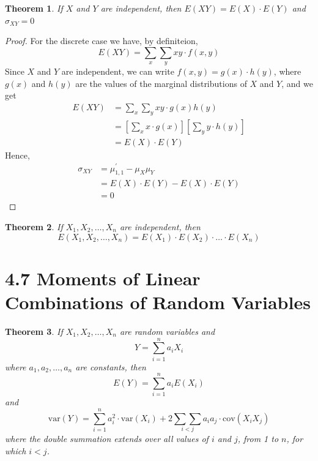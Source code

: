 \documentclass[
10pt,reqno
]{amsart}
\newtheorem{theorem}{Theorem}[section]
\theoremstyle{definition}
\begin{document}
\begin{theorem}
If \(X\) and \(Y\) are independent, then \(E(XY)= E(X) \cdot E(Y)\) and \(\sigma_{XY} =0 \)
\end{theorem}
\begin{proof}
For the discrete case we have, by definiteion, 
\[
E(XY)=\sum_x \sum_y xy \cdot f(x,y)
\]
Since \(X\) and \(Y\) are independent, we can write \(f(x,y)=g(x)\cdot h(y)\), where \(g(x)\) and \(h(y)\) are the values of the marginal distributions of \(X\) and \(Y\), and we get
\begin{align*}
E(XY)&=\sum_x \sum_y xy \cdot g(x) h(y)\\
&=\left [ \sum_x x \cdot g(x) \right ]\left [ \sum_y y \cdot h(y) \right ]\\
&= E(X) \cdot E(Y)
\end{align*}
Hence,
\begin{align*}
\sigma_{XY} &= \mu_{1,1}^{'}-\mu_{X} \mu_{Y}\\
&=E(X) \cdot E(Y) - E(X) \cdot E(Y)\\
&=0
\end{align*}
\end{proof}

\begin{theorem}
If \(X_1, X_2,\ldots,X_n\) are independent, then 
\[
E(X_1, X_2,\ldots,X_n)=E(X_1)\cdot E(X_2) \cdot \ldots \cdot E(X_n)
\]
\end{theorem}

\newpage

\section*{4.7 Moments of Linear Combinations of Random Variables}

\begin{theorem}
If \(X_1, X_2,\ldots,X_n\) are random variables and 
\[
Y = \sum_{i=1}^n a_i X_i
\]
where \(a_1, a_2, \ldots, a_n\) are constants, then 
\[
E(Y) = \sum_{i=1}^n a_i E(X_i)
\]
and
\[
\text{var}(Y)=\sum_{i=1}^n a_i^2 \cdot \text{var}(X_i)+ 2 \underset{i < j}{\sum \sum} a_i a_j \cdot \text{cov} (X_i X_j)
\]
where the double summation extends over all values of \(i\) and \(j\), from 1 to \(n\), for which \(i < j\).
\end{theorem}
\end{document}
